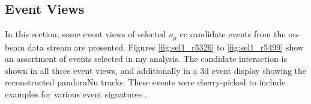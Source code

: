 \subsection{Event Views} \label{sec:EventViews}
In this section, some event views of selected $\nu_{\mu}$ \gls{cc} candidate events from the on-beam data stream are presented. Figures \ref{fig:sel1_r5326} to \ref{fig:sel1_r5499} show an assortment of events selected in my analysis. The candidate interaction is shown in all three event views, and additionally in a \gls{3d} event display showing the reconstructed pandoraNu tracks. These events were cherry-picked to include examples for various event signatures \cite{MicroBooNECCInclPN}.

\begin{figure}[htbp]
\begin{adjustwidth}{-1cm}{-1cm}
\centering
{}
 \\
   

\end{adjustwidth}
\end{figure}

